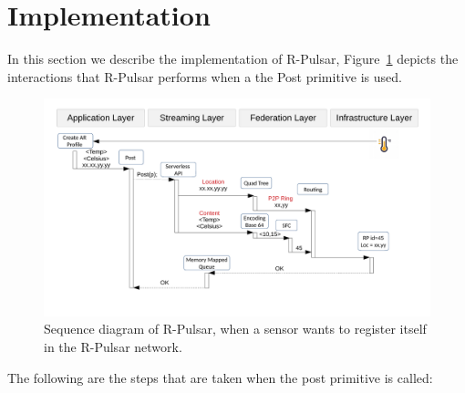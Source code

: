 
\section{Implementation}

In this section we describe the implementation of R-Pulsar, Figure~\ref{fig:diagram} depicts the interactions that R-Pulsar performs when a the Post primitive is used.

\begin{figure}[htb!]
  \centering
  \hspace*{-2cm}   
    \includegraphics[width=1\textwidth]{Figures/Diagram.pdf}
  \caption{Sequence diagram of R-Pulsar, when a sensor wants to register itself in the R-Pulsar network.} \label{fig:diagram}
\end{figure}

\noindent The following are the steps that are taken when the post primitive is called:


